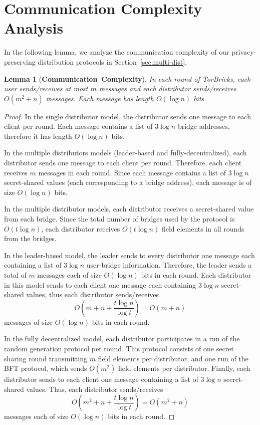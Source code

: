 \documentclass[letterpaper,twocolumn,10pt]{article}
\newtheorem{lemma}{Lemma}
\newcommand{\bricks}{}
\def\bricks/{\mbox{TorBricks}}
\newcommand{\sfsize}{\fontsize{0.68\baselineskip}{0.68\baselineskip}\selectfont}
\newcommand{\sans}[1]{\textbf{\textsf{\sfsize \mbox{#1}}}}
\begin{document}
\section{Communication Complexity Analysis} \label{sec:commcomplex}
In the following lemma, we analyze the communication complexity of our privacy-preserving distribution protocols in Section~\ref{sec:multi-dist}.
\begin{lemma}[\sans{Communication Complexity}]
	In each round of \bricks/, each user sends/receives at most $m$ messages and each distributor sends/receives ${O(m^2 + n)}$ messages. Each message has length $O(\log{n})$ bits.
\end{lemma}
\begin{proof}
	In the single distributor model, the distributor sends one message to each client per round. Each message contains a list of $3\log{n}$ bridge addresses, therefore it has length $O(\log{n})$ bits.
	
	In the multiple distributors models (leader-based and fully-decentralized), each distributor sends one message to each client per round. Therefore, each client receives $m$ messages in each round. Since each message contains a list of $3\log{n}$ secret-shared values (each corresponding to a bridge address), each message is of size $O(\log{n})$ bits.
	
	In the multiple distributor models, each distributor receives a secret-shared value from each bridge. Since the total number of bridges used by the protocol is $O(t\log{n})$, each distributor receives $O(t\log{n})$ field elements in all rounds from the bridges.	
	
	In the leader-based model, the leader sends to every distributor one message each containing a list of $3\log{n}$ user-bridge information. Therefore, the leader sends a total of $m$ messages each of size $O(\log{n})$ bits in each round. Each distributor in this model sends to each client one message each containing $3\log{n}$ secret-shared values, thus each distributor sends/receives \[O\left(m + n + \frac{t\log{n}}{\log{t}}\right) = O(m + n)\] messages of size $O(\log{n})$ bits in each round.
	
	In the fully decentralized model, each distributor participates in a run of the random generation protocol per round. This protocol consists of one secret sharing round transmitting $m$ field elements per distributor, and one run of the BFT protocol, which sends $O(m^2)$ field elements per distributor. Finally, each distributor sends to each client one message containing a list of $3\log{n}$ secret-shared values. Thus, each distributor sends/receives \[O\left(m^2 + n + \frac{t\log{n}}{\log{t}}\right) = O(m^2 + n)\] messages each of size $O(\log{n})$ bits in each round.
	
\end{proof}
\end{document}
